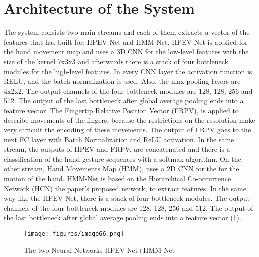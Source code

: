 \documentclass[12pt]{book}
\begin{document}
\section{Architecture of the System}
The system consists two main streams and each of them extracts a vector of the features that has built for: HPEV-Net and HMM-Net. HPEV-Net is applied for the hand movement map and uses a 3D CNN for the low-level features with the size of the kernel 7x3x3 and afterwards there is a stack of four bottleneck modules \cite{KAI2016} for the high-level features. In every CNN layer the activation function is RELU, and the batch normalization is used. Also, the max pooling layers are 4x2x2. The output channels of the four bottleneck modules are 128, 128, 256 and 512. The output of the last bottleneck after global average pooling ends into a feature vector. The Fingertip Relative Position Vector (FRPV), is applied to describe movements of the fingers, because the restrictions on the resolution make very difficult the encoding of these movements. The output of FRPV goes to the next FC layer with Batch Normalization and ReLU activation. In the same stream, the outputs of HPEV and FRPV, are concatenated and there is a classification of the hand gesture sequences with a softmax algorithm. On the other stream, Hand Movements Map (HMM), uses a 2D CNN for the for the motion of the hand. HMM-Net is based on the Hierarchical Co-occurrence Network (HCN) the paper's \cite{CHA2018} proposed network, to extract features. In the same way like the HPEV-Net, there is a stack of four bottleneck modules. The output channels of the four bottleneck modules are 128, 128, 256 and 512. The output of the last bottleneck after global average pooling ends into a feature vector (\ref{fig:fig34}). 

\begin{figure}[!htbp]
\centering
  \texttt{[image: figures/image66.png]}
  \\
  \caption{The two Neural Networks HPEV-Net+HMM-Net \cite{LIU2020}}
  \label{fig:fig34}
\end{figure}
\end{document}
